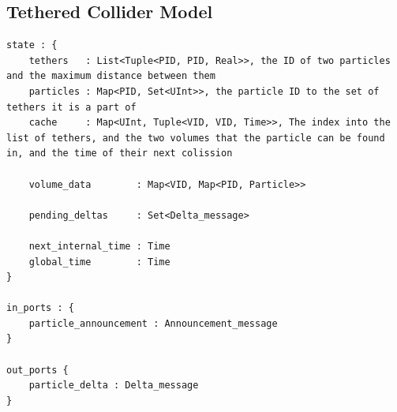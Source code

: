 \documentclass[conference]{IEEEtran}
\begin{document}
\subsection{Tethered Collider Model}
\begin{lstlisting}
state : {
	tethers   : List<Tuple<PID, PID, Real>>, the ID of two particles and the maximum distance between them
	particles : Map<PID, Set<UInt>>, the particle ID to the set of tethers it is a part of
	cache     : Map<UInt, Tuple<VID, VID, Time>>, The index into the list of tethers, and the two volumes that the particle can be found in, and the time of their next colission

	volume_data        : Map<VID, Map<PID, Particle>>
	
	pending_deltas     : Set<Delta_message>
	
	next_internal_time : Time
	global_time        : Time
}

in_ports : {
	particle_announcement : Announcement_message
}

out_ports {
	particle_delta : Delta_message
}

\end{lstlisting}
\end{document}
